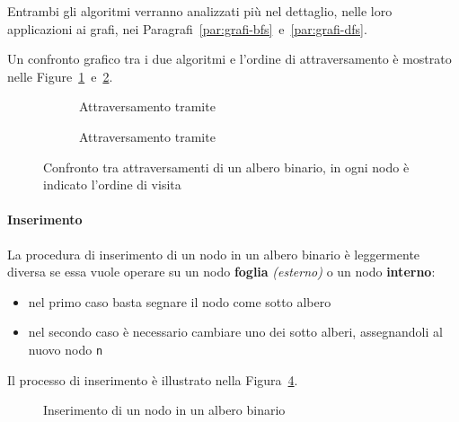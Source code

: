 \documentclass[italian, 10pt]{article}
\begin{document}
Entrambi gli algoritmi verranno analizzati più nel dettaglio, nelle loro applicazioni ai grafi, nei Paragrafi~\ref{par:grafi-bfs}~e~\ref{par:grafi-dfs}.

\bigskip
Un confronto grafico tra i due algoritmi e l'ordine di attraversamento è mostrato nelle Figure~\ref{fig:attraversamento-albero-bfs}~e~\ref{fig:attraversamento-albero-dfs}.

\begin{figure}
  \bigskip
  \centering
  \begin{subfigure}[t]{0.45\textwidth}
    \centering
    \caption{Attraversamento tramite \BFS}
    \label{fig:attraversamento-albero-bfs}
  \end{subfigure}
  \begin{subfigure}[t]{0.45\textwidth}
    \centering
    \caption{Attraversamento tramite \DFS}
    \label{fig:attraversamento-albero-dfs}
  \end{subfigure}
  \caption{Confronto tra attraversamenti di un albero binario, in ogni nodo è indicato l'ordine di visita}
  \label{fig:confronto-attraversamento-bfs-dfs}
  \bigskip
\end{figure}

\paragraph{Inserimento}
\label{par:inserimento-albero-binario}

La procedura di inserimento di un nodo in un albero binario è leggermente diversa se essa vuole operare su un nodo \textbf{foglia} \textit{(esterno)} o un nodo \textbf{interno}:

\begin{itemize}
  \item nel primo caso basta segnare il nodo come sotto albero
  \item nel secondo caso è necessario cambiare uno dei sotto alberi, assegnandoli al nuovo nodo \texttt{n}
\end{itemize}

\bigskip
Il processo di inserimento è illustrato nella Figura~\ref{fig:inserimento-albero-binario}.

\begin{figure}[htbp]
  \bigskip
  \centering
  \caption{Inserimento di un nodo in un albero binario}
  \label{fig:inserimento-albero-binario}
  \bigskip
\end{figure}
\end{document}
